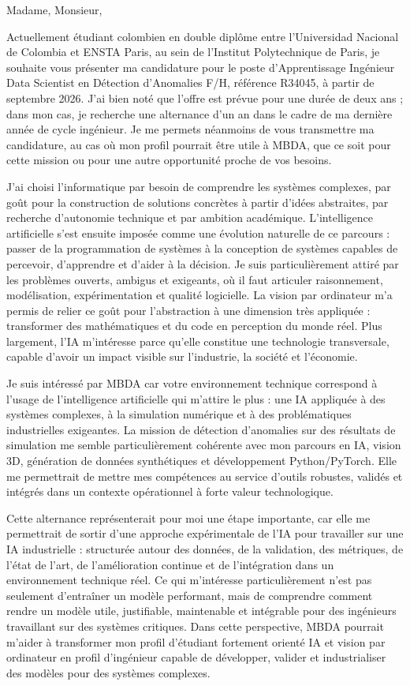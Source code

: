 \documentclass[10pt,a4paper]{article}
\begin{document}
{\small

Madame, Monsieur,

Actuellement étudiant colombien en double diplôme entre l’Universidad Nacional de Colombia et ENSTA Paris, au sein de l’Institut Polytechnique de Paris, je souhaite vous présenter ma candidature pour le poste d’Apprentissage Ingénieur Data Scientist en Détection d’Anomalies F/H, référence R34045, à partir de septembre 2026. J’ai bien noté que l’offre est prévue pour une durée de deux ans ; dans mon cas, je recherche une alternance d’un an dans le cadre de ma dernière année de cycle ingénieur. Je me permets néanmoins de vous transmettre ma candidature, au cas où mon profil pourrait être utile à MBDA, que ce soit pour cette mission ou pour une autre opportunité proche de vos besoins.

J’ai choisi l’informatique par besoin de comprendre les systèmes complexes, par goût pour la construction de solutions concrètes à partir d’idées abstraites, par recherche d’autonomie technique et par ambition académique. L’intelligence artificielle s’est ensuite imposée comme une évolution naturelle de ce parcours : passer de la programmation de systèmes à la conception de systèmes capables de percevoir, d’apprendre et d’aider à la décision. Je suis particulièrement attiré par les problèmes ouverts, ambigus et exigeants, où il faut articuler raisonnement, modélisation, expérimentation et qualité logicielle. La vision par ordinateur m’a permis de relier ce goût pour l’abstraction à une dimension très appliquée : transformer des mathématiques et du code en perception du monde réel. Plus largement, l’IA m’intéresse parce qu’elle constitue une technologie transversale, capable d’avoir un impact visible sur l’industrie, la société et l’économie.

Je suis intéressé par MBDA car votre environnement technique correspond à l’usage de l’intelligence artificielle qui m’attire le plus : une IA appliquée à des systèmes complexes, à la simulation numérique et à des problématiques industrielles exigeantes. La mission de détection d’anomalies sur des résultats de simulation me semble particulièrement cohérente avec mon parcours en IA, vision 3D, génération de données synthétiques et développement Python/PyTorch. Elle me permettrait de mettre mes compétences au service d’outils robustes, validés et intégrés dans un contexte opérationnel à forte valeur technologique.

Cette alternance représenterait pour moi une étape importante, car elle me permettrait de sortir d’une approche expérimentale de l’IA pour travailler sur une IA industrielle : structurée autour des données, de la validation, des métriques, de l’état de l’art, de l’amélioration continue et de l’intégration dans un environnement technique réel. Ce qui m’intéresse particulièrement n’est pas seulement d’entraîner un modèle performant, mais de comprendre comment rendre un modèle utile, justifiable, maintenable et intégrable pour des ingénieurs travaillant sur des systèmes critiques. Dans cette perspective, MBDA pourrait m’aider à transformer mon profil d’étudiant fortement orienté IA et vision par ordinateur en profil d’ingénieur capable de développer, valider et industrialiser des modèles pour des systèmes complexes.

}
\end{document}
